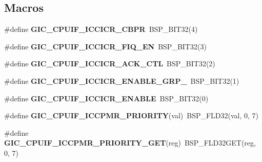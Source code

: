 \subsection*{Macros}
\begin{DoxyCompactItemize}
\item 
\mbox{\label{arm-gic-regs_8h_a52a32a98e76fb35deb9cbcfb4f759cf3}} 
\#define {\bfseries G\+I\+C\+\_\+\+C\+P\+U\+I\+F\+\_\+\+I\+C\+C\+I\+C\+R\+\_\+\+C\+B\+PR}~B\+S\+P\+\_\+\+B\+I\+T32(4)
\item 
\mbox{\label{arm-gic-regs_8h_a8a811ee8127c1f289eb1a035ceb3bd45}} 
\#define {\bfseries G\+I\+C\+\_\+\+C\+P\+U\+I\+F\+\_\+\+I\+C\+C\+I\+C\+R\+\_\+\+F\+I\+Q\+\_\+\+EN}~B\+S\+P\+\_\+\+B\+I\+T32(3)
\item 
\mbox{\label{arm-gic-regs_8h_a4b8d2228c91f61c461da2e24e85bf457}} 
\#define {\bfseries G\+I\+C\+\_\+\+C\+P\+U\+I\+F\+\_\+\+I\+C\+C\+I\+C\+R\+\_\+\+A\+C\+K\+\_\+\+C\+TL}~B\+S\+P\+\_\+\+B\+I\+T32(2)
\item 
\mbox{\label{arm-gic-regs_8h_ab071ed247533e6de43870ddadb7181a3}} 
\#define {\bfseries G\+I\+C\+\_\+\+C\+P\+U\+I\+F\+\_\+\+I\+C\+C\+I\+C\+R\+\_\+\+E\+N\+A\+B\+L\+E\+\_\+\+G\+R\+P\+\_}~B\+S\+P\+\_\+\+B\+I\+T32(1)
\item 
\mbox{\label{arm-gic-regs_8h_a53acf2c45e9df4020f75ba81d736af61}} 
\#define {\bfseries G\+I\+C\+\_\+\+C\+P\+U\+I\+F\+\_\+\+I\+C\+C\+I\+C\+R\+\_\+\+E\+N\+A\+B\+LE}~B\+S\+P\+\_\+\+B\+I\+T32(0)
\item 
\mbox{\label{arm-gic-regs_8h_ad06b13e0195fed9f6594f17e0ac8e587}} 
\#define {\bfseries G\+I\+C\+\_\+\+C\+P\+U\+I\+F\+\_\+\+I\+C\+C\+P\+M\+R\+\_\+\+P\+R\+I\+O\+R\+I\+TY}(val)~B\+S\+P\+\_\+\+F\+L\+D32(val, 0, 7)
\item 
\mbox{\label{arm-gic-regs_8h_a1c944493fdcbee149c630edd2c2c771a}} 
\#define {\bfseries G\+I\+C\+\_\+\+C\+P\+U\+I\+F\+\_\+\+I\+C\+C\+P\+M\+R\+\_\+\+P\+R\+I\+O\+R\+I\+T\+Y\+\_\+\+G\+ET}(reg)~B\+S\+P\+\_\+\+F\+L\+D32\+G\+ET(reg, 0, 7)
\item 
\mbox{\label{arm-gic-regs_8h_a944d1f5061ef50d0fa5f623d74538755}} 

\end{DoxyCompactItemize}
